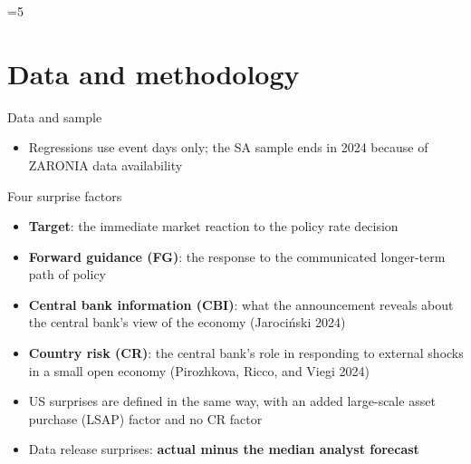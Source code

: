 \documentclass[
  ignorenonframetext,
  aspectratio=141,
]{beamer}
\providecommand{\tightlist}{%
  \setlength{\itemsep}{0pt}\setlength{\parskip}{0pt}}\usepackage{longtable,booktabs,array}
\let\oldsection\section
\renewcommand{\section}{\ifnum\value{section}=5 \appendix\fi\oldsection}
\begin{document}
\section{Data and methodology}\label{data-and-methodology}

\begin{frame}{Data and sample}
\label{data-and-sample}
\begin{table}[!h]
\centering\begingroup\fontsize{9}{11}\selectfont

\endgroup{}
\end{table}

\vspace{0.3cm}

\begin{itemize}
\tightlist
\item
  Regressions use event days only; the SA sample ends in 2024 because of
  ZARONIA data availability
\end{itemize}
\end{frame}

\begin{frame}{Four surprise factors}
\label{four-surprise-factors}
\begin{itemize}
\tightlist
\item
  \textbf{Target}: the immediate market reaction to the policy rate
  decision
\item
  \textbf{Forward guidance (FG)}: the response to the communicated
  longer-term path of policy
\item
  \textbf{Central bank information (CBI)}: what the announcement reveals
  about the central bank's view of the economy (Jarociński 2024)
\item
  \textbf{Country risk (CR)}: the central bank's role in responding to
  external shocks in a small open economy (Pirozhkova, Ricco, and Viegi
  2024)
\item
  US surprises are defined in the same way, with an added large-scale
  asset purchase (LSAP) factor and no CR factor
\item
  Data release surprises: \textbf{actual minus the median analyst
  forecast}
\end{itemize}
\end{frame}
\end{document}
